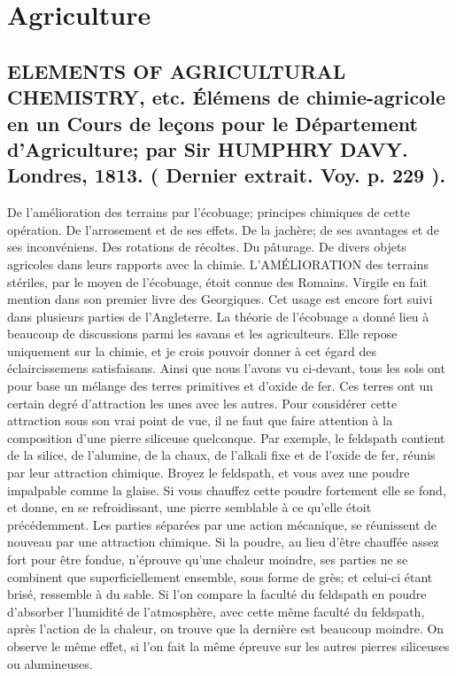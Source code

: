 \setcounter{page}{269}
\chapter{Agriculture}
\section{ELEMENTS OF AGRICULTURAL CHEMISTRY, etc. Élémens de chimie-agricole en un Cours de leçons pour le Département d'Agriculture; par Sir HUMPHRY DAVY. Londres, 1813. \large{( Dernier extrait. Voy. p. 229 ).}}
De l'amélioration des terrains par l'écobuage; principes chimiques de cette opération. De l'arrosement et de ses effets. De la jachère; de ses avantages et de ses inconvéniens. Des rotations de récoltes. Du pâturage. De divers objets agricoles dans leurs rapports avec la chimie.
L'AMÉLIORATION des terrains stériles, par le moyen de l'écobuage, étoit connue des Romains. Virgile en fait mention dans son premier livre des Georgiques. Cet usage est encore fort suivi dans plusieurs parties de l'Angleterre. La théorie de l'écobuage a donné lieu à beaucoup de discussions parmi les savans et les agriculteurs. Elle repose uniquement\setcounter{page}{270} sur la chimie, et je crois pouvoir donner à cet égard des éclaircissemens satisfaisans.
Ainsi que nous l'avons vu ci-devant, tous les sols ont pour base un mélange des terres primitives et d'oxide de fer. Ces terres ont un certain degré d'attraction les unes avec les autres. Pour considérer cette attraction sous son vrai point de vue, il ne faut que faire attention à la composition d'une pierre siliceuse quelconque. Par exemple, le feldspath contient de la silice, de l'alumine, de la chaux, de l'alkali fixe et de l'oxide de fer, réunis par leur attraction chimique. Broyez le feldspath, et vous avez une poudre impalpable comme la glaise. Si vous chauffez cette poudre fortement elle se fond, et donne, en se refroidissant, une pierre semblable à ce qu'elle étoit précédemment. Les parties séparées par une action mécanique, se réunissent de nouveau par une attraction chimique. Si la poudre, au lieu d'être chauffée assez fort pour être fondue, n'éprouve qu'une chaleur moindre, ses parties ne se combinent que superficiellement ensemble, sous forme de grès; et celui-ci étant brisé, ressemble à du sable.
Si l'on compare la faculté du feldspath en poudre d'absorber l'humidité de l'atmosphère,\setcounter{page}{271} avec cette même faculté du feldspath, après l’action de la chaleur, on trouve que la dernière est beaucoup moindre. On observe le même effet, si l’on fait la même épreuve sur les autres pierres siliceuses ou alumineuses.
